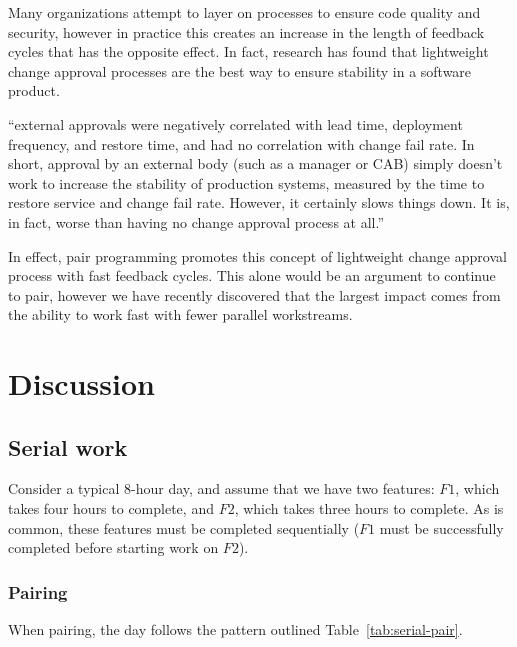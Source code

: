 \documentclass[letterpaper]{article}
\theoremstyle{definition}
\begin{document}
    Many organizations attempt to layer on processes to ensure code quality and security, however in practice this
    creates an increase in the length of feedback cycles that has the opposite effect.
    In fact, research has found that lightweight change approval processes are the best way to ensure stability in a
    software product.

    \begin{displayquote}
    ``external approvals were negatively correlated with lead time, deployment frequency, and restore time, and had no
    correlation with change fail rate.
    In short, approval by an external body (such as a manager or CAB) simply doesn't work to increase the stability of
    production systems, measured by the time to restore service and change fail rate.
    However, it certainly slows things down.
    It is, in fact, worse than having no change approval process at all.''
    \end{displayquote}

    In effect, pair programming promotes this concept of lightweight change approval process with fast feedback cycles.
    This alone would be an argument to continue to pair, however we have recently discovered that the largest impact
    comes from the ability to work fast with fewer parallel workstreams.


    \section{Discussion}\label{sec:discussion}

    \subsection{Serial work}\label{subsec:serial-work}

    Consider a typical 8-hour day, and assume that we have two features: $F1$, which takes four hours to complete, and
    $F2$, which takes three hours to complete.
    As is common, these features must be completed sequentially ($F1$ must be successfully completed before starting
    work on $F2$).

    \subsubsection{Pairing}\label{subsubsec:serial-pairing}

    When pairing, the day follows the pattern outlined Table~\ref{tab:serial-pair}.
\end{document}
